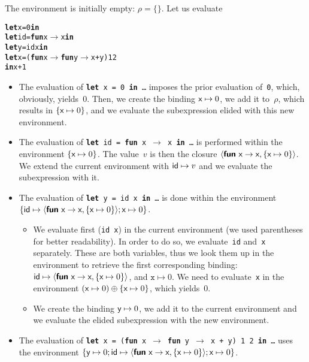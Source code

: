 The environment is initially empty: \(\rho = \{\}\). Let us evaluate
\begin{alltt}
\textbf{let} x = 0 \textbf{in}
  \textbf{let} id = \textbf{fun} x \(\rightarrow\) x \textbf{in}
  \textbf{let} y = id x \textbf{in}
  \textbf{let} x = (\textbf{fun} x \(\rightarrow\) \textbf{fun} y \(\rightarrow\) x + y) 1 2 
\textbf{in} x+1
\end{alltt}
\begin{itemize}

\item The evaluation of \texttt{\textbf{let} x = 0 \textbf{in} \ldots}
  imposes the prior evaluation of~\texttt{0}, which, obviously,
  yields~\(0\). Then, we create the binding $\textsf{x} \mapsto 0$, we
  add it to~\(\rho\), which results in $\{\textsf{x} \mapsto 0\}$, and
  we evaluate the subexpression elided with this new environment.

\item The evaluation of \texttt{\textbf{let} id = \textbf{fun} x \(\rightarrow\) x
    \textbf{in} \ldots} is performed within the environment
  $\{\textsf{x} \mapsto 0\}$. The value~\(v\) is then the closure
  $\langle\textsf{\textbf{fun}} \,\, \textsf{x} \rightarrow \textsf{x}, \{\textsf{x} \mapsto
  0\}\rangle$. We extend the current environment with
  $\textsf{id} \mapsto v$ and we evaluate the subexpression with it.

\item The evaluation of \texttt{\textbf{let} y = id x \textbf{in}
    \ldots} is done within the environment $\{\textsf{id} \mapsto
  \langle\textsf{\textbf{fun}} \,\, \textsf{x} \rightarrow \textsf{x}, \{\textsf{x}
  \mapsto 0\}\rangle; \textsf{x} \mapsto 0\}$.
    \begin{itemize}

      \item We evaluate first (\texttt{id x}) in the current
        environment (we used parentheses for better readability). In
        order to do so, we evaluate~\texttt{id} and~\texttt{x}
        separately. These are both variables, thus we look them up in
        the environment to retrieve the first corresponding
        binding: \(\textsf{id} \mapsto \langle\textsf{\textbf{fun}} \,\, \textsf{x} \rightarrow \textsf{x}, \{\textsf{x} \mapsto
        0\}\rangle\), and \(\texttt{x} \mapsto 0\). We need to
        evaluate~\texttt{x} in the environment $(\textsf{x} \mapsto
        0) \oplus \{\textsf{x} \mapsto 0\}$, which yields~\(0\).

      \item We create the binding $\textsf{y} \mapsto 0$, we add it to
        the current environment and we evaluate the elided
        subexpression with the new environment.
 
    \end{itemize}

  \item The evaluation of \texttt{\textbf{let} x = (\textbf{fun} x \(\rightarrow\)
      \textbf{fun} y \(\rightarrow\) x + y) 1 2 \textbf{in} \ldots}
      uses the environment $\{\textsf{y} \mapsto 0; \textsf{id} \mapsto
    \langle\textsf{\textbf{fun}} \,\, \textsf{x} \rightarrow \textsf{x}, \{\textsf{x}
    \mapsto 0\}\rangle; \textsf{x} \mapsto 0\}$.

\end{itemize}

